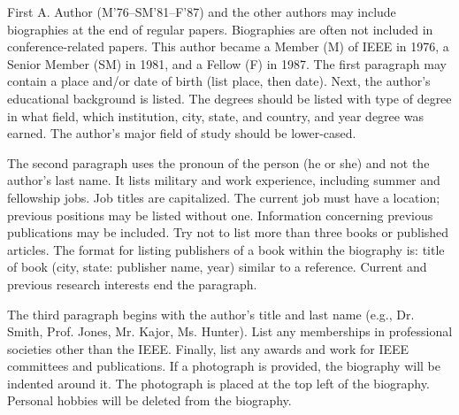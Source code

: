 \documentclass[transmag]{IEEEtran}
\begin{document}
\begin{IEEEbiographynophoto}{First A. Author} (M'76--SM'81--F'87) and the other authors may 
include biographies at the end of regular papers. Biographies are often not 
included in conference-related papers. This author became a Member (M) of 
IEEE in 1976, a Senior Member (SM) in 1981, and a Fellow (F) in 1987. The 
first paragraph may contain a place and/or date of birth (list place, then 
date). Next, the author's educational background is listed. The degrees 
should be listed with type of degree in what field, which institution, city, 
state, and country, and year degree was earned. The author's major field of 
study should be lower-cased.

The second paragraph uses the pronoun of the person (he or she) and not the 
author's last name. It lists military and work experience, including summer 
and fellowship jobs. Job titles are capitalized. The current job must have a 
location; previous positions may be listed without one. Information 
concerning previous publications may be included. Try not to list more than 
three books or published articles. The format for listing publishers of a 
book within the biography is: title of book (city, state: publisher name, 
year) similar to a reference. Current and previous research interests end 
the paragraph.

The third paragraph begins with the author's title and last name (e.g., Dr. 
Smith, Prof. Jones, Mr. Kajor, Ms. Hunter). List any memberships in 
professional societies other than the IEEE. Finally, list any awards and 
work for IEEE committees and publications. If a photograph is provided, the 
biography will be indented around it. The photograph is placed at the top 
left of the biography. Personal hobbies will be deleted from the
biography.
\end{IEEEbiographynophoto}
\end{document}
